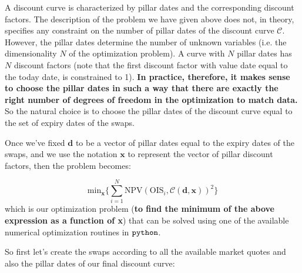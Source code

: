 A discount curve is characterized by pillar dates and the corresponding discount factors. The description of the problem we have given above does not, in theory, specifies any constraint on the number of pillar dates of the discount curve \(\mathcal{C}\). However, the pillar dates determine the number of unknown variables (i.e. the dimensionality \(N\) of the optimization problem). A curve with \(N\) pillar dates has \(N\) discount factors (note that the first discount factor with value date equal to the today date, is constrained to 1). \textbf{In practice, therefore, it makes sense to choose the pillar dates in such a way that there are exactly the right number of degrees of freedom in the optimization to match data.} So the natural choice is to choose the pillar dates of the discount curve equal to the set of expiry dates of the swaps.

Once we've fixed \(\mathbf{d}\) to be a vector of pillar dates equal to the expiry dates of the swaps, and we use the notation \(\mathbf{x}\) to represent the vector of pillar discount factors, then the problem becomes:

\begin{equation}
\mathrm{min}_{\mathbf{x}} \Big\{\sum_{i=1}^{N}\mathrm{NPV}(\mathrm{OIS}_i, \mathcal{C}(\mathbf{d}, \mathbf{x}))^2\Big\}
\end{equation}
which is our optimization problem (\textbf{to find the minimum of the
above expression as a function of x}) that can be solved using one of
the available numerical optimization routines in \(\tt{python}\).

So first let's create the swaps according to all the available market
quotes and also the pillar dates of our final discount curve:

